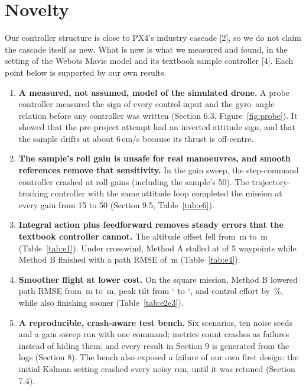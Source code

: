 \section{Novelty}
Our controller structure is close to PX4's industry cascade [2], so we do not claim the cascade itself as new. What is new is what we measured and found, in the setting of the Webots Mavic model and its textbook sample controller [4]. Each point below is supported by our own results.
\begin{enumerate}[itemsep=2pt,topsep=2pt]
\item \textbf{A measured, not assumed, model of the simulated drone.} A probe controller measured the sign of every control input and the gyro--angle relation before any controller was written (Section 6.3, Figure~\ref{fig:probe}). It showed that the pre-project attempt had an inverted attitude sign, and that the sample drifts at about 6\,cm/s because its thrust is off-centre.
\item \textbf{The sample's roll gain is unsafe for real manoeuvres, and smooth references remove that sensitivity.} In the gain sweep, the step-command controller crashed at roll gains  (including the sample's 50). The trajectory-tracking controller with the same attitude loop completed the mission at every gain from 15 to 50 (Section 9.5, Table~\ref{tab:e6}).
\item \textbf{Integral action plus feedforward removes steady errors that the textbook controller cannot.} The altitude offset fell from \,m to \,m (Table~\ref{tab:e1}). Under crosswind, Method A stalled at  of 5 waypoints while Method B finished with a path RMSE of \,m (Table~\ref{tab:e4}).
\item \textbf{Smoother flight at lower cost.} On the square mission, Method B lowered path RMSE from \,m to \,m, peak tilt from $^\circ$ to $^\circ$, and control effort by \,\%, while also finishing sooner (Table~\ref{tab:e2e3}).
\item \textbf{A reproducible, crash-aware test bench.} Six scenarios, ten noise seeds and a gain sweep run with one command; metrics count crashes as failures instead of hiding them; and every result in Section 9 is generated from the logs (Section 8). The bench also exposed a failure of our own first design: the initial Kalman setting crashed every noisy run, until it was retuned (Section 7.4).
\end{enumerate}
